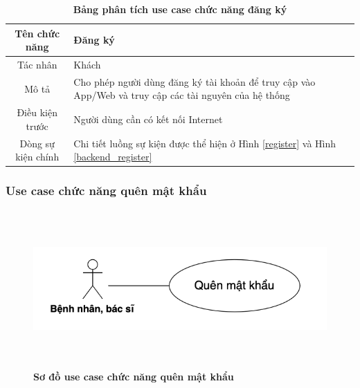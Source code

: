   \begin{table}[H]
    \caption{\bfseries \fontsize{12pt}{0pt}\selectfont Bảng phân tích use case chức năng đăng ký}
    \centering
    \begin{tabularx}{0.9\textwidth}{|c|X|}
      \hline
      \textbf{Tên chức năng} & \textbf{Đăng ký} \\
      \hline
      Tác nhân & Khách \\
      \hline
      Mô tả & Cho phép người dùng đăng ký tài khoản để truy cập vào App/Web 
      và truy cập các tài nguyên của hệ thống \\
      \hline
      Điều kiện trước & Người dùng cần có kết nối Internet \\
      \hline
      Dòng sự kiện chính & 
        Chi tiết luồng sự kiện được thể hiện ở Hình \ref{register} và Hình \ref{backend_register}\\
      \hline
    \end{tabularx}
  \end{table}

\subsubsection{Use case chức năng quên mật khẩu}
  \begin{figure}[H]
    \centering
    \includegraphics[width=15cm,height=6cm]{Images/use_case/use_case_forgot_password.png}
    \caption[Sơ đồ use case chức năng quên mật khẩu]{\bfseries \fontsize{12pt}{0pt}
    \selectfont Sơ đồ use case chức năng quên mật khẩu}
    \label{use_case_forgot_password} %
  \end{figure}

